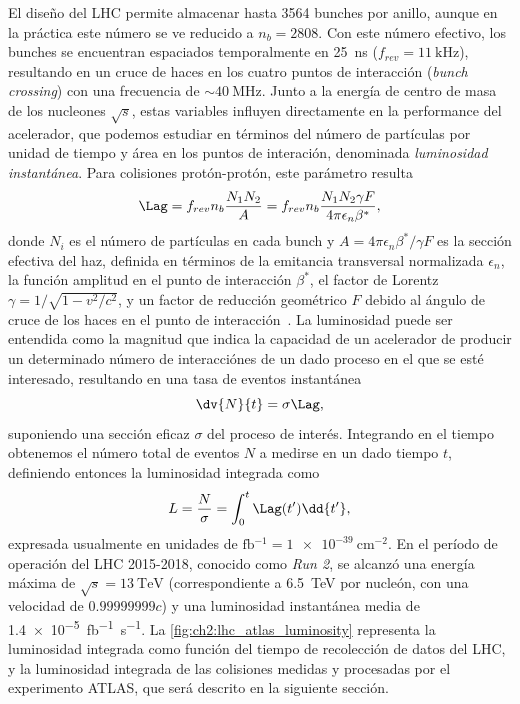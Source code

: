 El diseño del LHC permite almacenar hasta 3564 bunches por anillo, aunque en la práctica este número se ve reducido a $n_b = 2808$. Con este número efectivo, los bunches se encuentran espaciados temporalmente en \SI{25}{\nano\second} ($f_{rev} = \SI{11}{\kilo\hertz}$), resultando en un cruce de haces en los cuatro puntos de interacción (\textit{bunch crossing}) con una frecuencia de $\sim\SI{40}{\mega\hertz}$. Junto a la energía de centro de masa de los nucleones $\sqrt{s}$, estas variables influyen directamente en la performance del acelerador, que podemos estudiar en términos del número de partículas por unidad de tiempo y área en los puntos de interación, denominada \textit{luminosidad instantánea}. Para colisiones protón-protón, este parámetro resulta
\[ \Lag = f_{rev} n_b \frac{N_1 N_2}{A} = f_{rev} n_b \frac{N_1 N_2 \gamma F}{4 \pi \epsilon_n \beta^*}, \]
donde $N_i$ es el número de partículas en cada bunch y $A = 4\pi\epsilon_n \beta^* / \gamma F$ es la sección efectiva del haz, definida en términos de la emitancia transversal normalizada $\epsilon_n$, la función amplitud en el punto de interacción $\beta^*$, el factor de Lorentz $\gamma = 1/\sqrt{1-v^2/c^2}$, y un factor de reducción geométrico $F$ debido al ángulo de cruce de los haces en el punto de interacción~\cite{Lee2019}. La luminosidad puede ser entendida como la magnitud que indica la capacidad de un acelerador de producir un determinado número de interacciónes de un dado proceso en el que se esté interesado, resultando en una tasa de eventos instantánea
\[ \dv{N}{t} = \sigma \Lag, \]
suponiendo una sección eficaz $\sigma$ del proceso de interés. Integrando en el tiempo obtenemos el número total de eventos $N$ a medirse en un dado tiempo $t$, definiendo entonces la luminosidad integrada como
\[ L = \frac{N}{\sigma} = \int_0^t \Lag(t') \dd{t'}, \]
expresada usualmente en unidades de $\si{\femto\barn^{-1}} = \SI{1e-39}{\centi\meter^{-2}}$. En el período de operación del LHC 2015-2018, conocido como \textit{Run 2}, se alcanzó una energía máxima de $\sqrt{s} = \SI{13}{\TeV}$ (correspondiente a \SI{6.5}{\TeV} por nucleón, con una velocidad de $0.99999999c$) y una luminosidad instantánea media de \SI{1.4e-5}{\femto\barn^{-1} \second^{-1}}. La \cref{fig:ch2:lhc_atlas_luminosity} representa la luminosidad integrada como función del tiempo de recolección de datos del LHC, y la luminosidad integrada de las colisiones medidas y procesadas por el experimento ATLAS, que será descrito en la siguiente sección.

